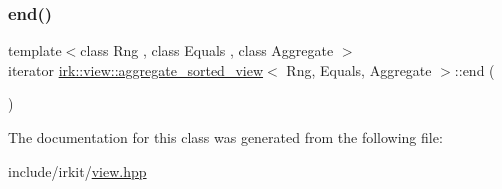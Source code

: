 \subsubsection{\texorpdfstring{end()}{end()}}
{\footnotesize\ttfamily template$<$class Rng , class Equals , class Aggregate $>$ \\
iterator \mbox{\hyperlink{classirk_1_1view_1_1aggregate__sorted__view}{irk\+::view\+::aggregate\+\_\+sorted\+\_\+view}}$<$ Rng, Equals, Aggregate $>$\+::end (\begin{DoxyParamCaption}{ }\end{DoxyParamCaption})\hspace{0.3cm}{\ttfamily [inline]}}



The documentation for this class was generated from the following file\+:\begin{DoxyCompactItemize}
\item 
include/irkit/\mbox{\hyperlink{view_8hpp}{view.\+hpp}}\end{DoxyCompactItemize}
